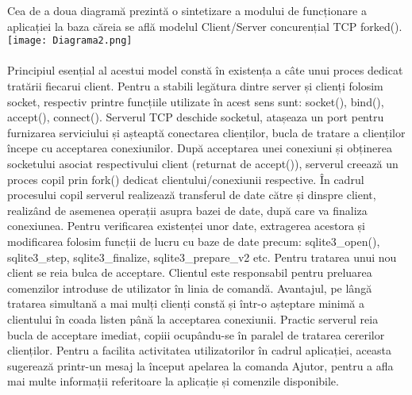 \documentclass{article}
\begin{document}
Cea de a doua diagramă prezintă o sintetizare a modului de funcționare a aplicației la baza căreia se află modelul Client/Server concurențial TCP forked().
\texttt{[image: Diagrama2.png]}
\\
\\
Principiul esențial al acestui model constă în existența a câte unui proces dedicat tratării fiecarui client. Pentru a stabili legătura dintre server și clienți folosim socket, respectiv printre funcțiile utilizate în acest sens sunt: socket(), bind(), accept(), connect(). Serverul TCP deschide socketul, atașeaza un port pentru furnizarea serviciului și așteaptă conectarea clienților, bucla de tratare a clienților începe cu acceptarea conexiunilor. După acceptarea unei conexiuni și obținerea socketului asociat respectivului client (returnat de accept()), serverul creează un proces copil prin fork() dedicat clientului/conexiunii respective. În cadrul procesului copil serverul realizează transferul de date către și dinspre client, realizând de asemenea operații asupra bazei de date, după care va finaliza conexiunea. Pentru verificarea existenței unor date, extragerea acestora și modificarea folosim funcții de lucru cu baze de date precum: sqlite3\_open(), sqlite3\_step, sqlite3\_finalize, sqlite3\_prepare\_v2 etc.  Pentru tratarea unui nou client se reia bulca de acceptare. Clientul este responsabil pentru preluarea comenzilor introduse de utilizator în linia de comandă. Avantajul, pe lângă tratarea simultană a mai mulți clienți constă și într-o așteptare minimă a clientului în coada listen până la acceptarea conexiunii. Practic serverul reia bucla de acceptare imediat, copiii ocupându-se în paralel de tratarea cererilor clienților. Pentru a facilita activitatea utilizatorilor în cadrul aplicației, aceasta sugerează printr-un mesaj la început apelarea la comanda Ajutor, pentru a afla mai multe informații referitoare la aplicație și comenzile disponibile.\\
\end{document}
